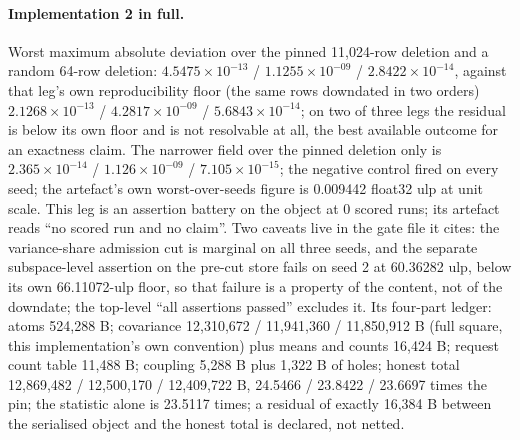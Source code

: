 \documentclass{article} %
\newcommand{\sci}[2]{\ensuremath{#1\times10^{#2}}}
\begin{document}
\paragraph{Implementation 2 in full.} Worst maximum absolute deviation over the pinned 11,024-row
deletion and a random 64-row deletion: \sci{4.5475}{-13} / \sci{1.1255}{-09} / \sci{2.8422}{-14},
against that leg's own reproducibility floor (the same rows downdated in two orders)
\sci{2.1268}{-13} / \sci{4.2817}{-09} / \sci{5.6843}{-14}; on two of three legs the residual is below
its own floor and is not resolvable at all, the best available outcome for an exactness claim. The
narrower field over the pinned deletion only is \sci{2.365}{-14} / \sci{1.126}{-09} /
\sci{7.105}{-15}; the negative control fired on every seed; the artefact's own worst-over-seeds
figure is 0.009442 float32 ulp at unit scale. %
This leg is an assertion battery on the object at 0 scored runs; its artefact reads ``no scored run
and no claim''. Two caveats live in the gate file it cites: the variance-share admission cut is
marginal on all three seeds, and the separate subspace-level assertion on the pre-cut store fails on
seed 2 at 60.36282 ulp, below its own 66.11072-ulp floor, so that failure is a property of the
content, not of the downdate; the top-level ``all assertions passed'' excludes it.
Its four-part ledger: atoms 524,288 B; covariance 12,310,672 / 11,941,360 / 11,850,912 B (full
square, this implementation's own convention) plus means and counts 16,424 B; request count table
11,488 B; coupling 5,288 B plus 1,322 B of holes; honest total 12,869,482 / 12,500,170 / 12,409,722
B, 24.5466 / 23.8422 / 23.6697 times the pin; the statistic alone is 23.5117 times; a residual of
exactly 16,384 B between the serialised object and the honest total is declared, not netted.
\end{document}
